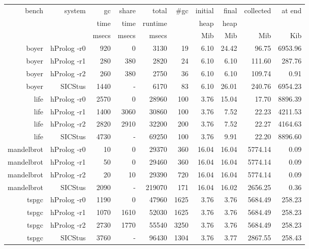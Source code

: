 \documentclass{tlp}
\begin{document}
\begin{table}[!]
\begin{center}
\footnotesize
\begin{tabular}{|r|r||r|r|r||r|r|r|r|r|} \hline
bench      & system        & gc     & share  &  total  &\#gc   & initial  & final     &collected&at end \\
           &               & time   & time   & runtime &       & heap     & heap      &         &         \\
           &               & msecs  & msecs  &  msecs  &       & Mib       & Mib        &  Mib     &  Kib  \\
\hline
\hline
boyer & hProlog -r0 & 920 & 0 & 3130 & 19 & 6.10 & 24.42 & 96.75 & 6953.96 \\ 
boyer & hProlog -r1 & 280 & 380 & 2820 & 24 & 6.10 & 6.10 & 111.60 & 287.76 \\ 
boyer & hProlog -r2 & 260 & 380 & 2750 & 36 & 6.10 & 6.10 & 109.74 & 0.91 \\ 
boyer & SICStus  & 1440 & - & 6170 & 83 & 6.10 & 26.01 & 240.76 & 6954.23 \\ 
\hline 

life & hProlog -r0 & 2570 & 0 & 28960 & 100 & 3.76 & 15.04 & 17.70 & 8896.39 \\ 
life & hProlog -r1 & 1400 & 3060 & 30860 & 100 & 3.76 & 7.52 & 22.23 & 4211.53 \\ 
life & hProlog -r2 & 2820 & 2910 & 32200 & 200 & 3.76 & 7.52 & 22.27 & 4164.63 \\ 
life & SICStus  & 4730 & - & 69250 & 100 & 3.76 & 9.91 & 22.20 & 8896.60 \\ 
\hline 

mandelbrot & hProlog -r0 & 10 & 0 & 29370 & 360 & 16.04 & 16.04 & 5774.14 & 0.09 \\ 
mandelbrot & hProlog -r1 & 50 & 0 & 29460 & 360 & 16.04 & 16.04 & 5774.14 & 0.09 \\ 
mandelbrot & hProlog -r2 & 20 & 10 & 29390 & 720 & 16.04 & 16.04 & 5774.14 & 0.09 \\ 
mandelbrot & SICStus  & 2090 & - & 219070 & 171 & 16.04 & 16.02 & 2656.25 & 0.36 \\ 
\hline 

tspgc & hProlog -r0 & 1190 & 0 & 47960 & 1625 & 3.76 & 3.76 & 5684.49 & 258.23 \\ 
tspgc & hProlog -r1 & 1070 & 1610 & 52030 & 1625 & 3.76 & 3.76 & 5684.49 & 258.23 \\ 
tspgc & hProlog -r2 & 2730 & 1770 & 55540 & 3250 & 3.76 & 3.76 & 5684.49 & 258.23 \\ 
tspgc & SICStus  & 3760 & - & 96430 & 1304 & 3.76 & 3.77 & 2867.55 & 258.43 \\ 
\hline 
\hline 


\end{tabular}
\end{center}
\end{table}
\end{document}
